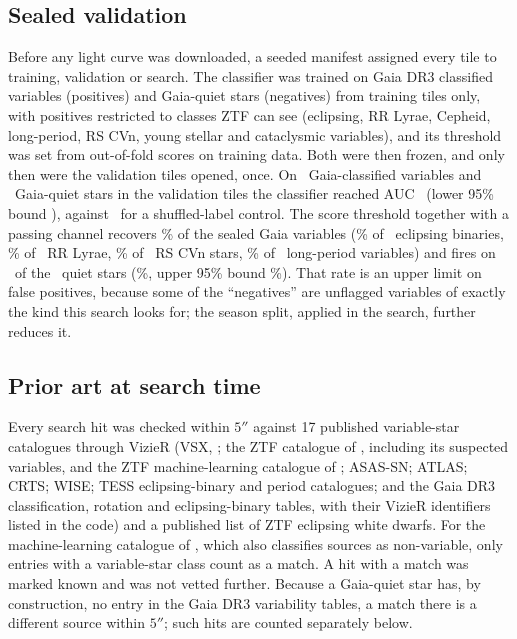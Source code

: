 \documentclass[twocolumn]{searchchev_preprint}
\begin{document}
\subsection{Sealed validation}\label{sec:val}
Before any light curve was downloaded, a seeded manifest assigned every tile to training, validation or search. The
classifier was trained on Gaia DR3 classified variables (positives) and Gaia-quiet stars (negatives) from training
tiles only, with positives restricted to classes ZTF can see (eclipsing, RR Lyrae, Cepheid, long-period, RS CVn, young
stellar and cataclysmic variables), and its threshold was set from out-of-fold scores on training data. Both were
then frozen, and only then were the validation tiles opened, once. On \nnvalpos\ Gaia-classified variables and
\nnvalneg\ Gaia-quiet stars in the validation tiles the classifier reached AUC \nauc\ (lower 95\% bound \nauclo),
against \naucshuf\ for a shuffled-label control. The score threshold together with a passing channel recovers
\nrulerecall\% of the sealed Gaia variables (\nrecEcl\% of \nnEcl\ eclipsing binaries, \nrecRR\% of \nnRR\ RR Lyrae,
\nrecRS\% of \nnRS\ RS CVn stars, \nrecLPV\% of \nnLPV\ long-period variables) and fires on \nrulefp\ of the
\nnvalneg\ quiet stars (\nrulefpr\%, upper 95\% bound \nrulefprhi\%). That rate is an upper limit on false positives,
because some of the ``negatives'' are unflagged variables of exactly the kind this search looks for; the season split,
applied in the search, further reduces it.

\subsection{Prior art at search time}
Every search hit was checked within $5''$ against 17 published variable-star catalogues through VizieR (VSX,
\citealt{Watson2006}; the ZTF catalogue of \citealt{Chen2020}, including its suspected variables, and the ZTF
machine-learning catalogue of \citealt{Arevalo2026}; ASAS-SN; ATLAS; CRTS; WISE; TESS eclipsing-binary and period catalogues; and the Gaia
DR3 classification, rotation and eclipsing-binary tables, with their VizieR identifiers listed in the code) and a
published list of ZTF eclipsing white dwarfs. For the machine-learning catalogue of \citet{Arevalo2026}, which also
classifies sources as non-variable, only entries with a variable-star class count as a match. A hit with a match was marked known and was not vetted further. Because a Gaia-quiet star has, by construction, no
entry in the Gaia DR3 variability tables, a match there is a different source within $5''$; such hits are counted
separately below.
\end{document}
